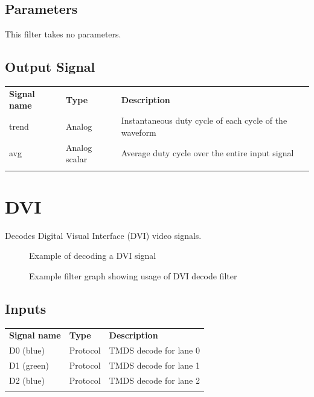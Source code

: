 \subsection{Parameters}

This filter takes no parameters.

\subsection{Output Signal}

\begin{tabularx}{16cm}{llX}
\thickhline
\textbf{Signal name} & \textbf{Type} & \textbf{Description} \\
\thickhline
trend & Analog & Instantaneous duty cycle of each cycle of the waveform\\
\thinhline
avg & Analog scalar & Average duty cycle over the entire input signal \\
\thickhline
\end{tabularx}


\pagebreak
\section{DVI}
\label{filter:dvi}

Decodes Digital Visual Interface (DVI) video signals.

\begin{figure}[h]
\centering
{}
\caption{Example of decoding a DVI signal}
\label{filter_dvi}
\end{figure}

\begin{figure}[h]
\centering
{}
\caption{Example filter graph showing usage of DVI decode filter}
\label{filter_dvi}
\end{figure}

\FloatBarrier

\subsection{Inputs}

\begin{tabularx}{16cm}{llX}
\thickhline
\textbf{Signal name} & \textbf{Type} & \textbf{Description} \\
\thickhline
D0 (blue) & Protocol & TMDS decode for lane 0\\
\thinhline
D1 (green) & Protocol & TMDS decode for lane 1\\
\thinhline
D2 (blue) & Protocol & TMDS decode for lane 2\\
\thickhline
\end{tabularx}

